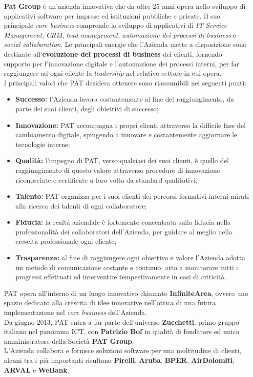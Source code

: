 \textbf{Pat Group} è un'azienda innovativa che da oltre 25 anni opera nello sviluppo di applicativi software per imprese ed istituzioni pubbliche e private. Il suo principale \textit{core business} comprende lo sviluppo di applicativi di \textit{IT Service Management}, \textit{CRM}, \textit{lead management}, \textit{automazione dei processi di business} e \textit{social collaboration}.
Le principali energie che l'Azienda mette a disposizione sono destinate all'\textbf{evoluzione dei processi di business} dei clienti, fornendo supporto per l'innovazione digitale e l'automazione dei processi interni, per far raggiungere ad ogni cliente la \textit{leadership} nel relativo settore in cui opera.\\
I principali valori che PAT desidera ottenere sono riassumibili nei seguenti punti:
\begin{itemize}
	\item \textbf{Successo:} l'Azienda lavora costantemente al fine del raggiungimento, da parte dei suoi clienti, degli obiettivi di successo;
	\item \textbf{Innovazione:} PAT accompagna i propri clienti attraverso la difficile fase del cambiamento digitale, spingendo a innovare e costantemente aggiornare le tecnologie interne;
	\item \textbf{Qualità:} l'impegno di PAT, verso qualsiasi dei suoi clienti, è quello del raggiungimento di questo valore attraverso procedure di innovazione riconosciute e certificate a loro volta da standard qualitativi;
	\item \textbf{Talento:} PAT organizza per i suoi clienti dei percorsi formativi interni mirati alla ricerca dei talenti di ogni collaboratore;
	\item \textbf{Fiducia:} la realtà aziendale è fortemente concentrata sulla fiducia nella professionalità dei collaboratori dell'Azienda, per guidare al meglio nella crescita professionale ogni cliente;
	\newpage
	\item \textbf{Trasparenza:} al fine di raggiungere ogni obiettivo e valore l'Azienda adotta un metodo di comunicazione costante e continuo, atto a monitorare tutti i progressi effettuati ed interventire tempestivamente in casi di criticità.
\end{itemize}
PAT opera all'interno di un luogo innovativo chiamato \textbf{InfiniteArea}, ovvero uno spazio dedicato alla crescita di idee innovative nell'ottica di una futura implementazione nel \textit{core business} dell'Azienda. \\
Da giugno 2013, PAT entra a far parte dell'universo \textbf{Zucchetti}, primo gruppo italiano nel panorama ICT, con \textbf{Patrizio Bof} in qualità di fondatore ed unico amministratore della Società \textbf{PAT Group}.\\
L'Azienda collabora e fornisce soluzioni software per una moltitudine di clienti, alcuni tra i più importanti risultano \textbf{Pirelli}, \textbf{Aruba}, \textbf{BPER}, \textbf{AirDolomiti}, \textbf{ARVAL} e \textbf{WeBank}.
